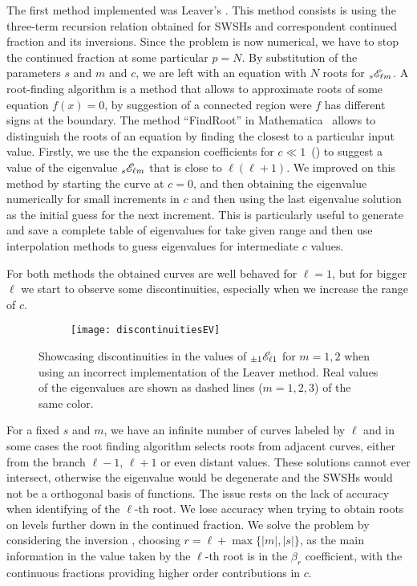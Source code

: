 The first method implemented was Leaver's \cite{Leaver1985}.
This method consists is using the three-term recursion relation obtained for SWSHs and correspondent continued fraction  and its inversions.
Since the problem is now numerical, we have to stop the continued fraction at some particular $p=N$.
By substitution of the parameters $s$ and $m$ and $c$, we are left with an equation with $N$ roots for $\uu[s]{\mathscr{E}}{\ell m}$.
A root-finding algorithm is a method that allows to approximate roots of some equation $f(x)=0$, by suggestion of a connected region were $f$ has different signs at the boundary.
The method ``FindRoot'' in Mathematica\texttrademark~ allows to distinguish the roots of an equation by finding the closest to a particular input value.
Firstly, we use the the expansion coefficients for $c\ll 1$~() to suggest a value of the eigenvalue $\uu[s]{\mathscr{E}}{\ell m}$ that is close to $\ell(\ell+1)$.
We improved on this method by starting the curve at $c=0$, and then obtaining the eigenvalue numerically for small increments in $c$ and then using the last eigenvalue solution as the initial guess for the next increment.
This is particularly useful to generate and save a complete table of eigenvalues for take given range and then use interpolation methods to guess eigenvalues for intermediate $c$ values.

For both methods the obtained curves are well behaved for $\ell=1$, but for bigger $\ell$ we start to observe some discontinuities, especially when we increase the range of $c$.
\begin{figure}[h]
	\centering
	\vspace{0.2cm}
	\begin{subfigure}[c]{0.6\textwidth}
        \texttt{[image: discontinuitiesEV]}
    \end{subfigure}
	\caption{Showcasing discontinuities in the values of $\uu[\pm 1]{\mathscr{E}}{\ell 1}$ for $m=1,2$ when using an incorrect implementation of the Leaver method. Real values of the eigenvalues are shown as dashed lines ($m=1,2,3$) of the same color.}
	\label{fig4:discontinuitiesEV}
\end{figure}
For a fixed $s$ and $m$, we have an infinite number of curves labeled by $\ell$ and in some cases the root finding algorithm selects roots from adjacent curves, either from the branch $\ell-1$, $\ell+1$ or even distant values.
These solutions cannot ever intersect, otherwise the eigenvalue would be degenerate and the SWSHs would not be a orthogonal basis of functions.
The issue rests on the lack of accuracy when identifying of the $\ell$-th root.
We lose accuracy when trying to obtain roots on levels further down in the continued fraction.
We solve the problem by considering the inversion , choosing $r=\ell+\max\{|m|,|s|\}$, as the main information in the value taken by the $\ell$-th root is in the $\beta_r$ coefficient, with the continuous fractions providing higher order contributions in $c$.

